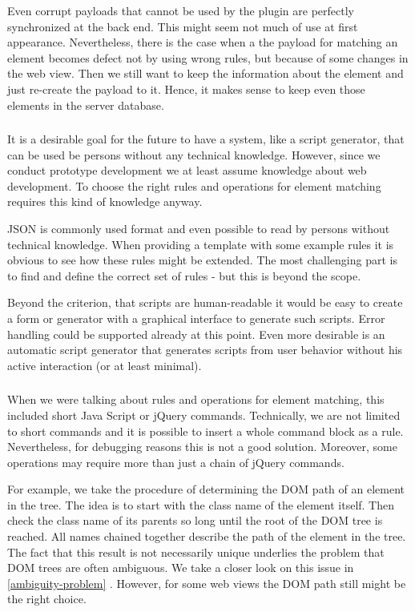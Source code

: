 Even corrupt payloads that cannot be used by the plugin are perfectly synchronized at the back end. This might seem not much of use at first appearance. Nevertheless, there is the case when a the payload for matching an element becomes defect not by using wrong rules, but because of some changes in the web view. Then we still want to keep the information about the element and just re-create the payload to it. Hence, it makes sense to keep even those elements in the server database.

\subsubsection[Syntax]{\reqSiii}

It is a desirable goal for the future to have a system, like a script generator, that can be used be persons without any technical knowledge. However, since we conduct prototype development we at least assume knowledge about web development. To choose the right rules and operations for element matching requires this kind of knowledge anyway. 

JSON is commonly used format and even possible to read by persons without technical knowledge. When providing a template with some example rules it is obvious to see how these rules might be extended. 
The most challenging part is to find and define the correct set of rules - but this is beyond the scope. 

Beyond the criterion, that scripts are human-readable it would be easy to create a form or generator with a graphical interface to generate such scripts. Error handling could be supported already at this point. Even more desirable is an automatic script generator that generates scripts from user behavior without his active interaction (or at least minimal). 

\subsubsection[Plugin Extension]{\reqSiv}

When we were talking about rules and operations for element matching, this included short Java Script or jQuery commands. Technically, we are not limited to short commands and it is possible to insert a whole command block as a rule. Nevertheless, for debugging reasons this is not a good solution. Moreover, some operations may require more than just a chain of jQuery commands. 

For example, we take the procedure of determining the DOM path of an element in the tree. The idea is to start with the class name of the element itself. Then check the class name of its parents so long until the root of the DOM tree is reached. All names chained together describe the path of the element in the tree. The fact that this result is not necessarily unique underlies the problem that DOM trees are often ambiguous. We take a closer look on this issue in \ref{ambiguity-problem} . However, for some web views the DOM path still might be the right choice. 

